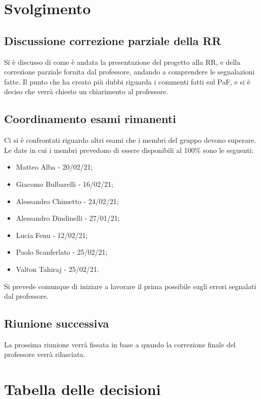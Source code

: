 \documentclass[]{article}
\begin{document}
	\newpage

	\section{Svolgimento}
		\subsection{Discussione correzione parziale della RR}
		Si è discusso di come è andata la presentazione del progetto alla RR, e della correzione parziale fornita dal professore, andando a comprendere le segnalazioni fatte.
		Il punto che ha creato più dubbi riguarda i commenti fatti sul PaF, e si è deciso che verrà chiesto un chiarimento al professore.\\
		
		\subsection{Coordinamento esami rimanenti}
		Ci si è confrontati riguardo altri esami che i membri del gruppo devono superare.\\
		Le date in cui i membri prevedono di essere disponibili al 100\% sono le seguenti:
		\begin{itemize}
			\item Matteo Alba - 20/02/21;
			\item Giacomo Bulbarelli - 16/02/21;
			\item Alessandro Chimetto - 24/02/21;
			\item Alessandro Dindinelli - 27/01/21;
			\item Lucia Fenu - 12/02/21;
			\item Paolo Scanferlato - 25/02/21;
			\item Valton Tahiraj - 25/02/21.
		\end{itemize}
		Si prevede comunque di iniziare a lavorare il prima possibile sugli errori segnalati dal professore.\\
		
		\subsection{Riunione successiva}
		La prossima riunione verrà fissata in base a quando la correzione finale del professore verrà rilasciata.\\
		
		\newpage
		
		\section{Tabella delle decisioni}
		
\end{document}

